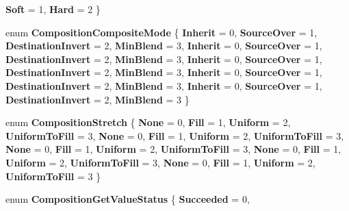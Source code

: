 \begin{DoxyCompactItemize}
{\bfseries Soft} = 1, 
{\bfseries Hard} = 2
 \}
\item 
\mbox{\label{namespace_windows_1_1_u_i_1_1_composition_a70df9b7791d5834e00518dd51febcf2e}} 
enum {\bfseries Composition\+Composite\+Mode} \{ \newline
{\bfseries Inherit} = 0, 
{\bfseries Source\+Over} = 1, 
{\bfseries Destination\+Invert} = 2, 
{\bfseries Min\+Blend} = 3, 
\newline
{\bfseries Inherit} = 0, 
{\bfseries Source\+Over} = 1, 
{\bfseries Destination\+Invert} = 2, 
{\bfseries Min\+Blend} = 3, 
\newline
{\bfseries Inherit} = 0, 
{\bfseries Source\+Over} = 1, 
{\bfseries Destination\+Invert} = 2, 
{\bfseries Min\+Blend} = 3, 
\newline
{\bfseries Inherit} = 0, 
{\bfseries Source\+Over} = 1, 
{\bfseries Destination\+Invert} = 2, 
{\bfseries Min\+Blend} = 3, 
\newline
{\bfseries Inherit} = 0, 
{\bfseries Source\+Over} = 1, 
{\bfseries Destination\+Invert} = 2, 
{\bfseries Min\+Blend} = 3
 \}
\item 
\mbox{\label{namespace_windows_1_1_u_i_1_1_composition_abe147aa23cb612204b73bb75dc3137e8}} 
enum {\bfseries Composition\+Stretch} \{ \newline
{\bfseries None} = 0, 
{\bfseries Fill} = 1, 
{\bfseries Uniform} = 2, 
{\bfseries Uniform\+To\+Fill} = 3, 
\newline
{\bfseries None} = 0, 
{\bfseries Fill} = 1, 
{\bfseries Uniform} = 2, 
{\bfseries Uniform\+To\+Fill} = 3, 
\newline
{\bfseries None} = 0, 
{\bfseries Fill} = 1, 
{\bfseries Uniform} = 2, 
{\bfseries Uniform\+To\+Fill} = 3, 
\newline
{\bfseries None} = 0, 
{\bfseries Fill} = 1, 
{\bfseries Uniform} = 2, 
{\bfseries Uniform\+To\+Fill} = 3, 
\newline
{\bfseries None} = 0, 
{\bfseries Fill} = 1, 
{\bfseries Uniform} = 2, 
{\bfseries Uniform\+To\+Fill} = 3
 \}
\item 
\mbox{\label{namespace_windows_1_1_u_i_1_1_composition_a9ddfa4d3a911ddf582cee8e20b4e8748}} 
enum {\bfseries Composition\+Get\+Value\+Status} \{ \newline
{\bfseries Succeeded} = 0, 

\end{DoxyCompactItemize}

